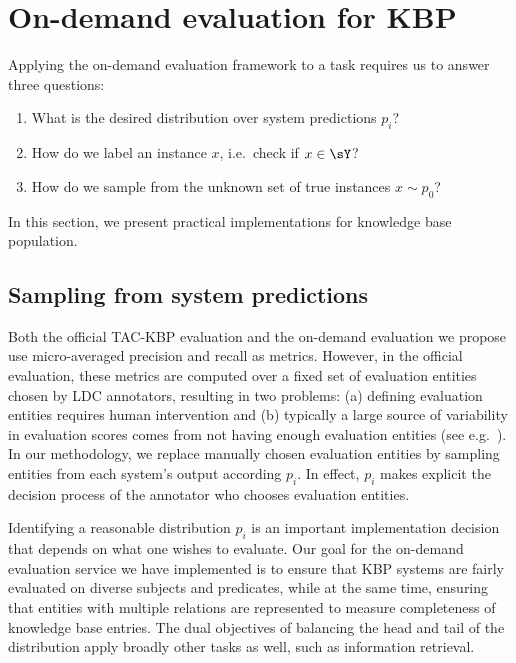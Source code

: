 \section{On-demand evaluation for KBP}
\label{sec:kbpo:application}
Applying the on-demand evaluation framework to a task requires us to answer three questions:
\begin{enumerate}
    \itemsep0pt
  \item What is the desired distribution over system predictions $p_i$?
  \item How do we label an instance $x$, i.e.\ check if $x \in \sY$?
  \item How do we sample from the unknown set of true instances $x \sim p_0$?
\end{enumerate}
In this section, we present practical implementations for knowledge base population.

\subsection{Sampling from system predictions}
Both the official TAC-KBP evaluation and the on-demand evaluation we propose use micro-averaged precision and recall as metrics. However, in the official evaluation, these metrics are computed over a fixed set of evaluation entities chosen by LDC annotators, resulting in two problems: (a) defining evaluation entities requires human intervention and (b) typically a large source of variability in evaluation scores comes from not having enough evaluation entities (see e.g.\ \citep{webber2010measurement}). In our methodology, we replace manually chosen evaluation entities by sampling entities from each system’s output according $p_i$. In effect, $p_i$ makes explicit the decision process of the annotator who chooses evaluation entities.

Identifying a reasonable distribution $p_i$ is an important implementation decision that depends on what one wishes to evaluate.
Our goal for the on-demand evaluation service we have implemented is to ensure that KBP systems are fairly evaluated on diverse subjects and predicates, while at the same time, ensuring that entities with multiple relations are represented to measure completeness of knowledge base entries.
The dual objectives of balancing the head and tail of the distribution apply broadly other tasks as well, such as information retrieval.

